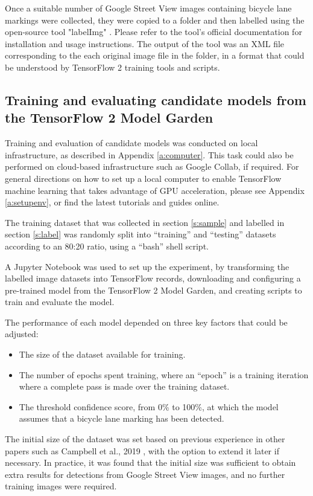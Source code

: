\documentclass[11pt,twoside]{report}
\begin{document}
Once a suitable number of Google Street View images containing bicycle lane markings were collected, they were copied to a folder and then labelled using the open-source tool "labelImg" \cite{labelImg}.  Please refer to the tool's official documentation for installation and usage instructions.  The output of the tool was an XML file corresponding to the each original image file in the folder, in a format that could be understood by TensorFlow 2 training tools and scripts.

\subsection{Training and evaluating candidate models from the TensorFlow 2 Model Garden}

Training and evaluation of candidate models was conducted on local infrastructure, as described in Appendix \ref{a:computer}.  This task could also be performed on cloud-based infrastructure such as Google Collab, if required.  For general directions on how to set up a local computer to enable TensorFlow machine learning that takes advantage of GPU acceleration, please see Appendix \ref{a:setupenv}, or find the latest tutorials and guides online.

The training dataset that was collected in section \ref{s:sample} and labelled in section \ref{s:label} was randomly split into ``training'' and ``testing'' datasets according to an 80:20 ratio, using a ``bash'' shell script.

A Jupyter Notebook was used to set up the experiment, by transforming the labelled image datasets into TensorFlow records, downloading and configuring a pre-trained model from the TensorFlow 2 Model Garden, and creating scripts to train and evaluate the model.

The performance of each model depended on three key factors that could be adjusted:

\begin{itemize}
\item{The size of the dataset available for training.}
\item{The number of epochs spent training, where an ``epoch'' is a training iteration where a complete pass is made over the training dataset.}
\item{The threshold confidence score, from 0\% to 100\%, at which the model assumes that a bicycle lane marking has been detected.}
\end{itemize}

The initial size of the dataset was set based on previous experience in other papers such as Campbell et al., 2019 \cite{CAMPBELL2019101350}, with the option to extend it later if necessary.  In practice, it was found that the initial size was sufficient to obtain extra results for detections from Google Street View images, and no further training images were required.
\end{document}

